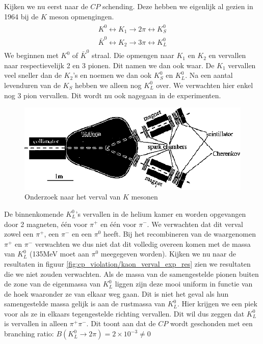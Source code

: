 \documentclass[../main.tex]{subfiles}
\begin{document}
Kijken we nu eerst naar de $CP$ schending. Deze hebben we eigenlijk al gezien in 1964 bij de $K$ meson opmengingen.
\begin{equation}
    \begin{aligned}
        \label{eq:k_mes_osc}
        \begin{array}{l}
            K^{0} \leftrightarrow K_{1} \rightarrow 2 \pi \leftrightarrow K_{S}^{0} \\
            \bar{K}^{0} \leftrightarrow K_{2} \rightarrow 3 \pi \leftrightarrow K_{L}^{0}
        \end{array}
    \end{aligned}
\end{equation}
We beginnen met $K^0$ of $\bar{K}^0$ straal. Die opmengen naar $K_1$ en $K_2$ en vervallen naar respectievelijk 2 en 3 pionen. Dit namen we dan ook waar. De $K_1$ vervallen veel sneller dan de $K_2$'s en noemen we dan ook $K_S^0$ en $K_L^0$. Na een aantal levenduren van de $K_S$ hebben we alleen nog $K_L^0$ over. We verwachten hier enkel nog 3 pion vervallen. Dit wordt nu ook nagegaan in de experimenten.

\begin{figure}[h]
    \centering
    \includegraphics[width=0.7\linewidth]{cp_violation/kaon_verval_exp.png}
    \caption{Onderzoek naar het verval van $K$ mesonen}%
    \label{fig:cp_violation/kaon_verval_exp}
\end{figure}

De binnenkomende $K_L^0$'s vervallen in de helium kamer en worden opgevangen door 2 magneten, één voor $\pi^+$ en één voor $\pi^-$. We verwachten dat dit verval zowel een $\pi^+$, een $\pi^-$ en een $\pi^0$ heeft. Bij het recombineren van de waargenomen $\pi^+$ en $\pi^-$ verwachten we dus niet dat dit volledig overeen komen met de massa van $K_L^0$ (135MeV moet aan $\pi^0$ meegegeven worden). Kijken we nu naar de resultaten in figuur \ref{fig:cp_violation/kaon_verval_exp_res} zien we resultaten die we niet zouden verwachten. Als de massa van de samengestelde pionen buiten de zone van de eigenmassa van $K_L^0$ liggen zijn deze mooi uniform in functie van de hoek waaronder ze van elkaar weg gaan. Dit is niet het geval als hun samengestelde massa gelijk is aan de rustmassa van $K_L^0$. Hier krijgen we een piek voor als ze in elkaars tegengestelde richting vervallen. Dit wil dus zeggen dat $K_L^0$ is vervallen in alleen $\pi^+\pi^-$. Dit toont aan dat de $CP$ wordt geschonden met een branching ratio: $B\left(K_{L}^{0} \rightarrow 2 \pi\right)=2 \times 10^{-3} \neq 0$
\end{document}
